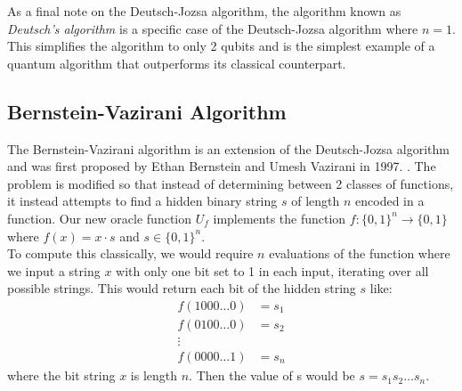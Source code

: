 \documentclass[reqno]{amsart}
\numberwithin{equation}{section}
\numberwithin{figure}{section}
\begin{document}
\begin{justify}
As a final note on the Deutsch-Jozsa algorithm, the algorithm known as \textit{Deutsch's algorithm} is a specific case of the Deutsch-Jozsa algorithm where $n = 1$. This simplifies the algorithm to only 2 qubits and is the simplest example of a quantum algorithm that outperforms its classical counterpart.
\end{justify}
\subsection{Bernstein-Vazirani Algorithm}
\begin{justify}
    The Bernstein-Vazirani algorithm is an extension of the Deutsch-Jozsa algorithm and was first proposed by Ethan Bernstein and Umesh Vazirani in 1997. \cite{BernsteinVazirani1997}. The problem is modified so that instead of determining between 2 classes of functions, it instead attempts to find a hidden binary string $s$ of length $n$ encoded in a function. Our new oracle function $U_{f}$ implements the function $f: \{0, 1\}^{n} \rightarrow \{0, 1\}$ where $f(x) = x \cdot s$ and $s \in \{0, 1\}^{n}$. \\

    To compute this classically, we would require $n$ evaluations of the function where we input a string $x$ with only one bit set to 1 in each input, iterating over all possible strings. This would return each bit of the hidden string $s$ like:
    \begin{equation*}
        \begin{split}
            f(1000\ldots0) &= s_{1} \\
            f(0100\ldots0) &= s_{2} \\
            \vdots \\
            f(0000\ldots1) &= s_{n}
        \end{split}
    \end{equation*}
where the bit string $x$ is length $n$. Then the value of s would be $s = s_{1}s_{2}\ldots s_{n}$. \\


\end{justify}
\end{document}
